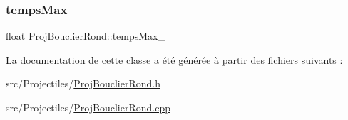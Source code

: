 \subsubsection{\texorpdfstring{temps\+Max\+\_\+}{tempsMax\_}}
{\footnotesize\ttfamily float Proj\+Bouclier\+Rond\+::temps\+Max\+\_\+\hspace{0.3cm}{\ttfamily [protected]}}



La documentation de cette classe a été générée à partir des fichiers suivants \+:\begin{DoxyCompactItemize}
\item 
src/\+Projectiles/\hyperlink{_proj_bouclier_rond_8h}{Proj\+Bouclier\+Rond.\+h}\item 
src/\+Projectiles/\hyperlink{_proj_bouclier_rond_8cpp}{Proj\+Bouclier\+Rond.\+cpp}\end{DoxyCompactItemize}
